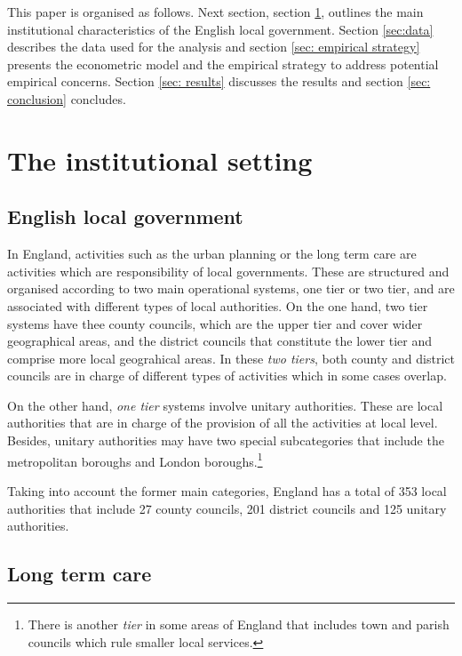\documentclass[12pt,letterpaper]{article}
\begin{document}
      This paper is organised as follows. Next section, section \ref{sec: institutional}, outlines the 
      main institutional characteristics of the English local government. Section \ref{sec:data} describes  the 
      data used for the analysis and section \ref{sec: empirical strategy} presents the econometric model 
      and the empirical strategy to address potential empirical concerns. 
      Section \ref{sec: results} discusses the results and section \ref{sec: conclusion} 
      concludes.
      
  \section{The institutional setting}
  \label{sec: institutional}
\subsection{English local government}

In England, activities such as the urban planning or the long term care are activities which are responsibility 
of local governments. These are structured and organised according to 
two main operational systems, one tier or two tier, and are associated with different types of local 
authorities. On the one hand, two tier systems have thee county councils, which are the upper tier and cover wider 
geographical areas, and the district councils that constitute the lower tier and comprise 
more local geograhical areas. In these \textit{two tiers}, both county and 
district councils are in charge of different types of activities which in some cases overlap.  

On the other hand, \textit{one tier} systems involve unitary authorities. These 
are local authorities that are in 
charge of the provision of all the activities at local level. Besides, unitary authorities may have two special subcategories
that include the metropolitan boroughs and London boroughs.\footnote{There is another \textit{tier} in some areas of England that
includes town and parish councils which rule smaller local services.}

Taking into account the former main categories, England has a total of 353 local authorities that include 27 
county councils, 201 district councils and 125 unitary authorities. 

 \normalsize{\subsection{Long term care}}
 
\end{document}

